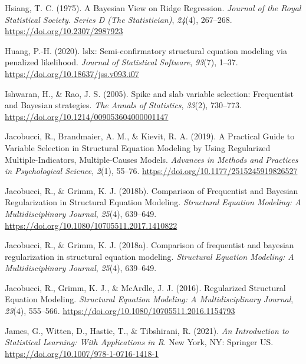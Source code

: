 \documentclass[
  man, donotrepeattitle,floatsintext]{apa6}
\newlength{\cslhangindent}
\newlength{\cslentryspacingunit} %
\newenvironment{CSLReferences}[2] %
 {%
  \setlength{\parindent}{0pt}
  \ifodd #1
  \let\oldpar\par
  \def\par{\hangindent=\cslhangindent\oldpar}
  \fi
  \setlength{\parskip}{#2\cslentryspacingunit}
 }%
 {}
\begin{document}
\begin{CSLReferences}{1}{0}
\leavevmode{}%
Hsiang, T. C. (1975). A {Bayesian} {View} on {Ridge} {Regression}. \emph{Journal of the Royal Statistical Society. Series D (The Statistician)}, \emph{24}(4), 267--268. \url{https://doi.org/10.2307/2987923}

\leavevmode{}%
Huang, P.-H. (2020). {lslx}: Semi-confirmatory structural equation modeling via penalized likelihood. \emph{Journal of Statistical Software}, \emph{93}(7), 1--37. \url{https://doi.org/10.18637/jss.v093.i07}

\leavevmode{}%
Ishwaran, H., \& Rao, J. S. (2005). Spike and slab variable selection: {Frequentist} and {Bayesian} strategies. \emph{The Annals of Statistics}, \emph{33}(2), 730--773. \url{https://doi.org/10.1214/009053604000001147}

\leavevmode{}%
Jacobucci, R., Brandmaier, A. M., \& Kievit, R. A. (2019). A {Practical} {Guide} to {Variable} {Selection} in {Structural} {Equation} {Modeling} by {Using} {Regularized} {Multiple}-{Indicators}, {Multiple}-{Causes} {Models}. \emph{Advances in Methods and Practices in Psychological Science}, \emph{2}(1), 55--76. \url{https://doi.org/10.1177/2515245919826527}

\leavevmode{}%
Jacobucci, R., \& Grimm, K. J. (2018b). Comparison of {Frequentist} and {Bayesian} {Regularization} in {Structural} {Equation} {Modeling}. \emph{Structural Equation Modeling: A Multidisciplinary Journal}, \emph{25}(4), 639--649. \url{https://doi.org/10.1080/10705511.2017.1410822}

\leavevmode{}%
Jacobucci, R., \& Grimm, K. J. (2018a). Comparison of frequentist and bayesian regularization in structural equation modeling. \emph{Structural Equation Modeling: A Multidisciplinary Journal}, \emph{25}(4), 639--649.

\leavevmode{}%
Jacobucci, R., Grimm, K. J., \& McArdle, J. J. (2016). Regularized {Structural} {Equation} {Modeling}. \emph{Structural Equation Modeling: A Multidisciplinary Journal}, \emph{23}(4), 555--566. \url{https://doi.org/10.1080/10705511.2016.1154793}

\leavevmode{}%
James, G., Witten, D., Hastie, T., \& Tibshirani, R. (2021). \emph{An {Introduction} to {Statistical} {Learning}: With {Applications} in {R}}. New York, NY: Springer US. \url{https://doi.org/10.1007/978-1-0716-1418-1}


\end{CSLReferences}
\end{document}
